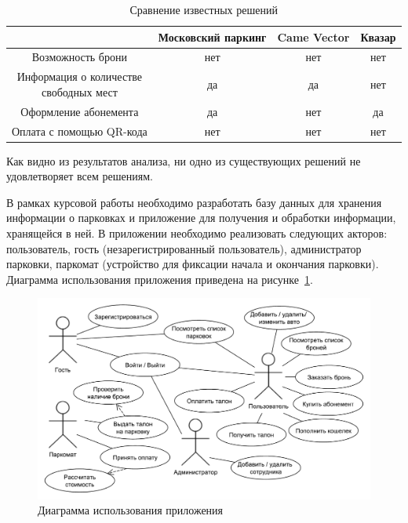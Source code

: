 \renewcommand{\thetable}{\thesubsection.\arabic{table}}
\begin{table}[H]
	\begin{center}
		\begin{center}
			\caption{\label{tab:existing_decision}Сравнение известных решений}
		\end{center}
		\begin{tabular}{|c|c|c|c|}
			\hline 
			~ & Московский паркинг & Came Vector & Квазар \\ \hline
        Возможность брони & нет & нет & нет \\ \hline
        \specialcell{Информация о количестве \\ свободных мест} & да & да & нет \\ \hline
        Оформление абонемента & да & нет & да \\ \hline
        Оплата с помощью QR-кода & нет & нет & нет \\ \hline
		\end{tabular}
	\end{center}
\end{table}
Как видно из результатов анализа, ни одно из существующих решений не удовлетворяет всем решениям.

В рамках курсовой работы необходимо разработать базу данных для хранения информации о парковках и приложение для получения и обработки информации, хранящейся в ней.
В приложении необходимо реализовать следующих акторов: пользователь, гость (незарегистрированный пользователь), администратор парковки, паркомат (устройство для фиксации начала и окончания парковки).
Диаграмма использования приложения приведена на рисунке~\ref{fig:use_case}.
\renewcommand{\thefigure}{\thesubsection.\arabic{figure}}
\begin{figure}[h]
	\centering
	\includegraphics[height=0.35\textheight]{svg/use_case}
	\caption{Диаграмма использования приложения}
	\label{fig:use_case}
\end{figure}

